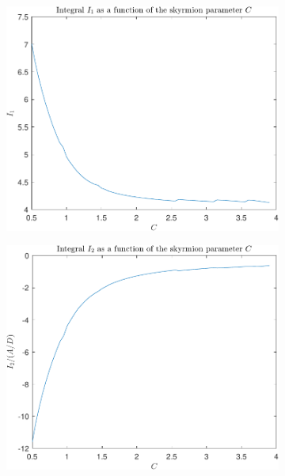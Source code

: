 \begin{figure}[h!]
\centering
\begin{subfigure}{.49\textwidth}
  \centering
  \includegraphics[width=\linewidth]{Figures/I1Plot.pdf}
  \caption{}
  \label{fig:ThetaInt1}
\end{subfigure}
\begin{subfigure}{.49\textwidth}
  \centering
  \includegraphics[width=\linewidth]{Figures/I2Plot.pdf}
  \caption{}
  \label{fig:ThetaInt2}
\end{subfigure}
\linebreak

\end{figure}
